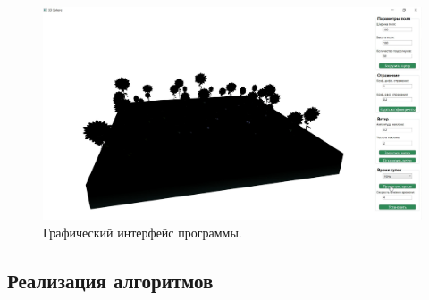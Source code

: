 \begin{figure}[H]
    \centering
    \includegraphics[width=150mm]{images/night_50}
    \caption{Графический интерфейс программы.}
    \label{images:Night}
\end{figure}

\subsection{Реализация алгоритмов}

